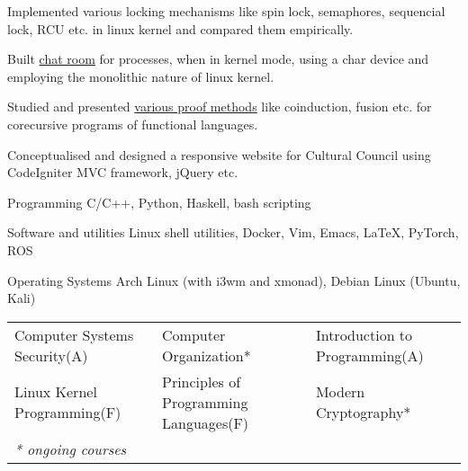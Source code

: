 \documentclass[11pt, a4paper]{cv}
\begin{document}
\begin{cventries}

    \begin{cvitems} %
        \item {Implemented various locking mechanisms like spin lock, semaphores, sequencial lock, RCU etc. in linux kernel and compared them empirically.}
        \item {Built \href{https://github.com/shivnshu/chatroom}{chat room} for processes, when in kernel mode, using a char device and employing the monolithic nature of linux kernel.}
        \item {Studied and presented \href{http://home.iitk.ac.in/~shivansh/resources/proofmethods-corecursion.pdf}{various proof methods} like coinduction, fusion etc. for corecursive programs of functional languages.}
        \item {Conceptualised and designed a responsive website for Cultural Council using CodeIgniter MVC framework, jQuery etc.}
    \end{cvitems}

\end{cventries}




\begin{cvskills}

  \cvskill
    {Programming} %
    {C/C++, Python, Haskell, bash scripting} %

  \cvskill
    {Software and utilities} %
    {Linux shell utilities, Docker, Vim, Emacs, \LaTeX, PyTorch, ROS} %

  \cvskill
    {Operating Systems} %
    {Arch Linux (with i3wm and xmonad), Debian Linux (Ubuntu, Kali)} %

\end{cvskills}

\begin{cventries}
        \begin{tabular}{l l l}
                Computer Systems Security(A)& Computer Organization* & Introduction to Programming(A)\\
                Linux Kernel Programming(F) & Principles of Programming Languages(F) & Modern Cryptography*\\
                \textit{\small {\color{lightgray}* ongoing courses}}
        \end{tabular}
\vspace{-0.3cm}
\end{cventries}


\begin{cventries}
        \begin{cvitems}
        \item {}
        \end{cvitems}
\end{cventries}

\end{document}
